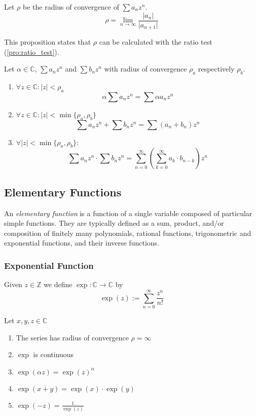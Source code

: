 \begin{proposition}\label{pro:conv_rad_ratio_test}
   Let \(\rho\) be the radius of convergence of \(\sum a_n z^n\).
   \[\rho = \lim_{n \to \infty} \frac{\lvert a_n\rvert}{\lvert a_{n+1}\rvert}\]
\end{proposition}
\begin{remark}
   This proposition states that \(\rho\) can be calculated with the ratio test (\ref{pro:ratio_test}).
\end{remark}

\begin{theorem}
   Let \(\alpha \in \mathbb{C}\), \(\sum a_n z^n\) and \(\sum b_n z^n\) with radius of convergence \(\rho_a\) respectively \(\rho_b\).
   \begin{enumerate}[label=\roman*, align=Center]
      \item \(\forall z \in \mathbb{C}: \lvert z\rvert < \rho_a\)
         \[\alpha \sum a_n z^n = \sum \alpha a_n z^n\]
      \item \(\forall z \in \mathbb{C}: \lvert z\rvert < \min\{\rho_a, \rho_b\}\)
         \[\sum a_n z^n + \sum b_n z^n = \sum (a_n + b_n)z^n\]
      \item \(\forall \lvert z\rvert < \min\{\rho_a, \rho_b\}:\)
         \[\sum a_n z^n \cdot \sum b_n z^n = \sum_{n=0}^\infty\left(\sum_{k=0}^\infty a_k \cdot b_{n-k}\right)z^n\]
   \end{enumerate}
\end{theorem}

\subsection{Elementary Functions}
An \emph{elementary function} is a function of a single variable composed of particular simple functions.
They are typically defined as a sum, product, and/or composition of finitely many polynomials, rational functions, trigonometric and exponential functions, and their inverse functions.

\subsubsection{Exponential Function}
\begin{definition}
   Given \(z \in \mathbb{Z}\) we define \(\exp: \mathbb{C} \to \mathbb{C}\) by
   \[\exp(z) := \sum_{n = 0}^\infty \frac{z^n}{n!}\]
\end{definition}

\begin{proposition}[Properties]
   Let \(x, y, z \in \mathbb{C}\)
   \begin{enumerate}[label=\roman*, align=Center]
      \item The series has radius of convergence \(\rho = \infty\)
      \item \(\exp\) is continuous
      \item \(\exp(\alpha z) = \exp(z)^\alpha\)
      \item \(\exp(x + y) = \exp(x) \cdot \exp(y)\)
      \item \(\exp(-z) = \frac{1}{\exp(z)}\)
   \end{enumerate}
\end{proposition}

